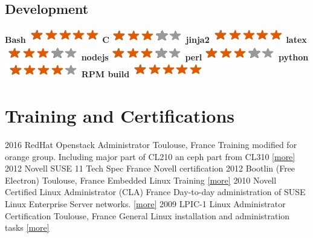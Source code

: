 \documentclass[]{friggeri-cv}
\begin{document}
\begin{aside}
    \section{Development}
        \textbf{Bash}\includegraphics[scale=0.40]{img/5stars.png}
        \textbf{C}\includegraphics[scale=0.40]{img/3stars.png}
        \textbf{jinja2}\includegraphics[scale=0.40]{img/5stars.png}
        \textbf{latex}\includegraphics[scale=0.40]{img/3stars.png}
        \textbf{nodejs}\includegraphics[scale=0.40]{img/3stars.png}
        \textbf{perl}\includegraphics[scale=0.40]{img/3stars.png}
        \textbf{python}\includegraphics[scale=0.40]{img/4stars.png}
        \textbf{RPM build}\includegraphics[scale=0.40]{img/5stars.png}
\end{aside}
\section{Training and Certifications}
\begin{entrylist}
    \entry
        {2016}
        {RedHat Openstack Administrator}
        {Toulouse, France}
        {Training modified for orange group. Including major part of CL210 an ceph part from CL310
	\href{https://www.redhat.com/fr/services/training/cl210-red-hat-openstack-administration}
	{[\underline{more}]}}
    \entry
        {2012}
        {Novell SUSE 11 Tech Spec}
        {France}
        {Novell certification}
    \entry
        {2012}
        {Bootlin (Free Electron)}
        {Toulouse, France}
        {Embedded Linux Training 
        \href{https://bootlin.com/training/embedded-linux/}{[\underline{more}]}}
    \entry
        {2010}
        {Novell Certified Linux Administrator (CLA)}
        {France}
        {Day-to-day administration of SUSE Linux Enterprise Server networks.
        \href{https://training.suse.com/certification/cla/cla-11/}{[\underline{more}]}}
    \entry
        {2009}
        {LPIC-1 Linux Administrator Certification}
        {Toulouse, France}
        {General Linux installation and administration tasks
        \href{http://www.lpi.org/our-certifications/lpic-1-overview}{[\underline{more}]}}
\end{entrylist}
\end{document}
